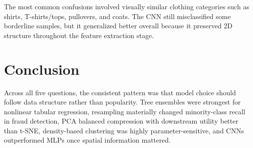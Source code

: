 \documentclass[11pt]{article}
\begin{document}
The most common confusions involved visually similar clothing categories such as shirts, T-shirts/tops, pullovers, and coats. The CNN still misclassified some borderline samples, but it generalized better overall because it preserved 2D structure throughout the feature extraction stage.

\section*{Conclusion}
Across all five questions, the consistent pattern was that model choice should follow data structure rather than popularity. Tree ensembles were strongest for nonlinear tabular regression, resampling materially changed minority-class recall in fraud detection, PCA balanced compression with downstream utility better than t-SNE, density-based clustering was highly parameter-sensitive, and CNNs outperformed MLPs once spatial information mattered.
\end{document}
